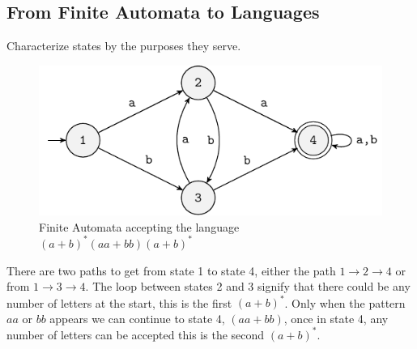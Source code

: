 \subsection{From Finite Automata to Languages}
Characterize states by the purposes they serve.\\
\begin{figure}[h!]
    \centering
    \includegraphics[width=0.6\linewidth]{lectures/figures/5-4fa.pdf}
    \caption{Finite Automata accepting the language \((a+b)^*(aa+bb)(a+b)^*\)}
\end{figure}
There are two  paths to get from state 1 to state 4, either the path $1 \rightarrow 2 \rightarrow 4$ or from $1 \rightarrow 3 \rightarrow 4$. The loop between states 2 and 3 signify that there could be any number of letters at the start, this is the first \((a+b)^*\). Only when the pattern \(aa\) or \(bb\) appears we can continue to state 4, \((aa+bb)\), once in state 4, any number of letters can be accepted this is the second \((a+b)^*\). 